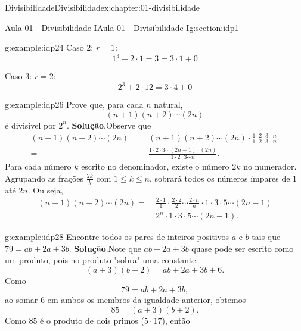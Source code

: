 \documentclass[oneside,10pt,]{book}
\newcommand{\blocktitlefont}{\relax}
\numberwithin{equation}{section}
\newcommand{\amp}{&}
\begin{document}
\begin{chapterptx}{Divisibilidade}{}{Divisibilidade}{}{}{x:chapter:01-divisibilidade}
\begin{sectionptx}{Aula 01 - Divisibilidade I}{}{Aula 01 - Divisibilidade I}{}{}{g:section:idp1}
\begin{example}{}{g:example:idp24}
Caso 2: \(r = 1\):%
\begin{equation*}
1^3+2\cdot 1 = 3 = 3\cdot 1+0
\end{equation*}
%
\par
Caso 3: \(r = 2\):%
\begin{equation*}
2^3+2\cdot 12 = 3\cdot 4+0
\end{equation*}
%
\end{example}
\begin{example}{}{g:example:idp26}%
Prove que, para cada \(n\) natural,%
\begin{equation*}
(n+1)(n+2)\cdots(2n)
\end{equation*}
é divisível por \(2^n\).%
\textbf{\blocktitlefont Solução}.\hypertarget{g:solution:idp27}{}\quad{}Observe que%
\begin{align*}
(n+1)(n+2)\cdots(2n) =\amp~  (n+1)(n+2)\cdots(2n)\cdot \frac{1\cdot 2\cdot 3\cdots n}{1\cdot 2\cdot 3\cdots n}.\\
=\amp~\frac{1\cdot 2 \cdot 3\cdots (2n-1)\cdot (2n)}{1\cdot 2\cdot 3\cdots n}.
\end{align*}
Para cada número \(k\) escrito no denominador, existe o número \(2k\) no numerador. Agrupando as frações \(\frac{2k}{k}\) com \(1\leq k\leq n\), sobrará todos os números ímpares de \(1\) até \(2n\). Ou seja,%
\begin{align*}
(n+1)(n+2)\cdots(2n) =\amp~\frac{2\cdot1}{1}\cdot\frac{2\cdot2}{2}\cdots\frac{2\cdot n}{n}\cdot 1\cdot3\cdot5\cdots (2n-1)\\
=\amp~2^n\cdot 1\cdot3\cdot5\cdots (2n-1).
\end{align*}
%
\end{example}
\begin{example}{}{g:example:idp28}%
Encontre todos os pares de inteiros positivos \(a\) e \(b\) tais que \(79 = ab+2a+3b\).%
\textbf{\blocktitlefont Solução}.\hypertarget{g:solution:idp29}{}\quad{}Note que \(ab+2a+3b\) quase pode ser escrito como um produto, pois no produto "sobra" uma constante:%
\begin{equation*}
(a+3)(b+2) = ab+2a+3b+6.
\end{equation*}
Como%
\begin{equation*}
79 = ab+2a+3b,
\end{equation*}
ao somar \(6\) em ambos os membros da igualdade anterior, obtemos%
\begin{equation*}
85 = (a+3)(b+2).
\end{equation*}
Como \(85\) é o produto de dois primos (\(5\cdot 17\)), então%
\begin{equation*}

\end{equation*}
\end{example}
\end{sectionptx}
\end{chapterptx}
\end{document}

